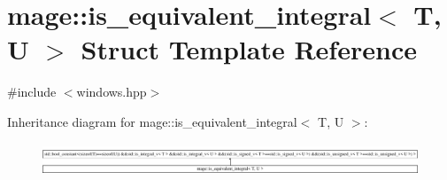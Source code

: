 \hypertarget{structmage_1_1is__equivalent__integral}{}\section{mage\+:\+:is\+\_\+equivalent\+\_\+integral$<$ T, U $>$ Struct Template Reference}
\label{structmage_1_1is__equivalent__integral}


{\ttfamily \#include $<$windows.\+hpp$>$}

Inheritance diagram for mage\+:\+:is\+\_\+equivalent\+\_\+integral$<$ T, U $>$\+:\begin{figure}[H]
\begin{center}
\leavevmode
\includegraphics[height=0.969697cm]{structmage_1_1is__equivalent__integral}
\end{center}
\end{figure}
